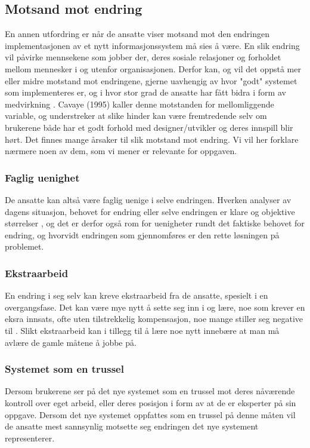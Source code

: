 \subsection{Motsand mot endring}
\label{chp: Motstand}

En annen utfordring er når de ansatte viser motsand mot den endringen implementasjonen av et nytt informasjonssystem må sies å være. En slik endring vil påvirke mennsekene som jobber der, deres sosiale relasjoner og forholdet mellom mennesker i og utenfor organisasjonen. Derfor kan, og vil det oppstå mer eller midre motstand mot endringene, gjerne uavhengig av hvor "godt" systemet som implementeres er, og i hvor stor grad de ansatte har fått bidra i form av medvirkning \cite{Jacobsen12}. Cavaye (1995) kaller denne motstanden for mellomliggende variable, og understreker at slike hinder kan være fremtredende selv om brukerene både har et godt forhold med designer/utvikler og deres innspill blir hørt. Det finnes mange årsaker til slik motstand mot endring. Vi vil her forklare nærmere noen av dem, som vi mener er relevante for oppgaven. 

\subsubsection{Faglig uenighet}
De ansatte kan altså være faglig uenige i selve endringen. Hverken analyser av dagens situasjon, behovet for endring eller selve endringen er klare og objektive størrelser \cite{Jacobsen12}, og det er derfor også rom for uenigheter rundt det faktiske behovet for endring, og hvorvidt endringen som gjennomføres er den rette løsningen på problemet. \cite{Jacobsen12}

\subsubsection{Ekstraarbeid}
En endring i seg selv kan kreve ekstraarbeid fra de ansatte, spesielt i en overgangsfase. Det kan være mye nytt å sette seg inn i og lære, noe som krever en eksra innsats, ofte uten tilstrekkelig kompensasjon, noe mange stiller seg negative til \cite{Jacobsen12}. Slikt ekstraarbeid kan i tillegg til å lære noe nytt innebære at man må avlære de gamle måtene å jobbe på. \cite{Jacobsen12}

\subsubsection{Systemet som en trussel}
Dersom brukerene ser på det nye systemet som en trussel mot deres nåværende kontroll over eget arbeid, eller deres posisjon i form av at de er eksperter på sin oppgave. Dersom det nye systemet oppfattes som en trussel på denne måten vil de ansatte mest sannsynlig motsette seg endringen det nye systement representerer. \cite{Cavaye95}

